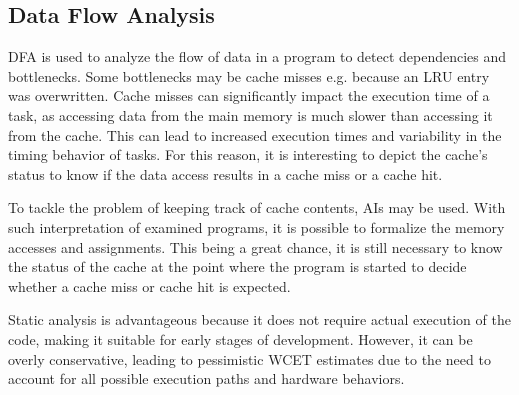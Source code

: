 \subsection{Data Flow Analysis}\label{sec:dfa}
\ac{DFA} is used to analyze the flow of data in a program to detect dependencies and bottlenecks.
Some bottlenecks may be cache misses e.g. because an \ac{LRU} entry was overwritten.
Cache misses can significantly impact the execution time of a task, as accessing data from the main memory is much slower than accessing it from the cache\cite{liCacheModelingRealtime1996}.
This can lead to increased execution times and variability in the timing behavior of tasks.
For this reason, it is interesting to depict the cache's status to know if the data access results in a cache miss or a cache hit.

To tackle the problem of keeping track of cache contents, \ac{AI}s may be used.
With such interpretation of examined programs, it is possible to formalize the memory accesses and assignments\cite{cousotAbstractInterpretationUnified1977}.
This being a great chance, it is still necessary to know the status of the cache at the point where the program is started to decide whether a cache miss or cache hit is expected.

Static analysis is advantageous because it does not require actual execution of the code, making it suitable for early stages of development. However, it can be overly conservative, leading to pessimistic WCET estimates due to the need to account for all possible execution paths and hardware behaviors.

